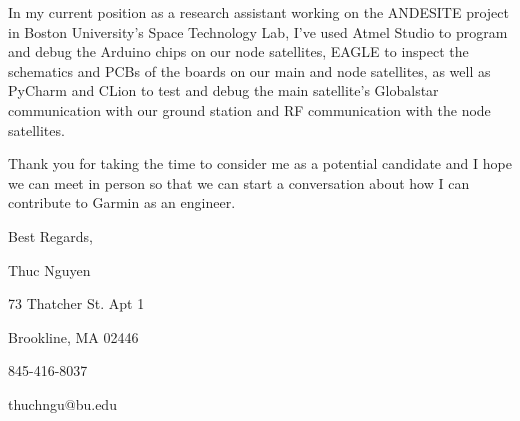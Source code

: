 \documentclass{article}
\begin{document}
\vspace{.6em}
In my current position as a research assistant  working on the ANDESITE project in Boston University's Space Technology Lab, I've used Atmel Studio to program and debug the Arduino chips on our node satellites, EAGLE to inspect the schematics and PCBs of the boards on our main and node satellites, as well as PyCharm and CLion to test and debug the main satellite's Globalstar communication with our ground station and RF communication with the node satellites.

\vspace{.6em}
Thank you for taking the time to consider me as a potential candidate and I hope we can meet in person so that we can start a conversation about how I can contribute to Garmin as an engineer.

\begin{flushleft}
\vspace{1.6em}
Best Regards,

\vspace{1em}

Thuc Nguyen

73 Thatcher St. Apt 1

Brookline, MA 02446

845-416-8037

thuchngu@bu.edu

\end{flushleft}
\end{document}
